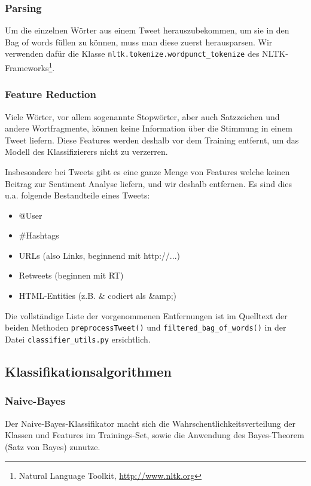 \documentclass[12pt, oneside]{report}   	%
\begin{document}
\subsubsection{Parsing}
Um die einzelnen Wörter aus einem Tweet herauszubekommen, um sie in den Bag of words füllen zu können, muss man diese zuerst herausparsen. 
Wir verwenden dafür die Klasse \verb|nltk.tokenize.wordpunct_tokenize| des NLTK-Frameworks\footnote{Natural Language Toolkit, \url{http://www.nltk.org}}.

\subsubsection{Feature Reduction}
Viele Wörter, vor allem sogenannte Stopwörter, aber auch Satzzeichen und andere Wortfragmente, können keine Information über die Stimmung in einem Tweet liefern. 
Diese Features werden deshalb vor dem Training entfernt, um das Modell des Klassifizierers nicht zu verzerren.

Insbesondere bei Tweets gibt es eine ganze Menge von Features welche keinen Beitrag zur Sentiment Analyse liefern, und wir deshalb entfernen. 
Es sind dies u.a. folgende Bestandteile eines Tweets:

\begin{itemize}
\item @User
\item \#Hashtags
\item URLs (also Links, beginnend mit http://...)
\item Retweets (beginnen mit RT)
\item HTML-Entities (z.B. \& codiert als \&amp;)
\end{itemize}


Die vollständige Liste der vorgenommenen Entfernungen ist im Quelltext der beiden Methoden \verb|preprocessTweet()| und \verb|filtered_bag_of_words()| in der Datei \verb|classifier_utils.py| ersichtlich. 



\subsection{Klassifikationsalgorithmen}
\subsubsection{Naive-Bayes}

Der Naive-Bayes-Klassifikator macht sich die Wahrschentlichkeitsverteilung der Klassen und Features im Trainings-Set, sowie die Anwendung des Bayes-Theorem (Satz von Bayes) zunutze.
\end{document}
